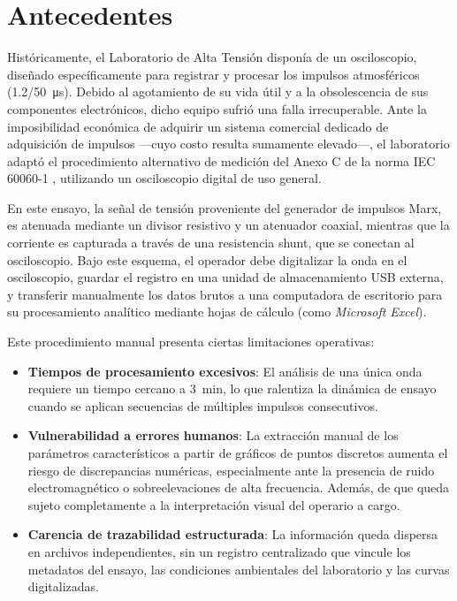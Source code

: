 \section{Antecedentes}
\label{sec:antecedentes}

Históricamente, el Laboratorio de Alta Tensión disponía de un osciloscopio, diseñado específicamente para registrar y procesar los impulsos atmosféricos (\qty[parse-numbers=false]{1.2/50}{\micro\second}). Debido al agotamiento de su vida útil y a la obsolescencia de sus componentes electrónicos, dicho equipo sufrió una falla irrecuperable. Ante la imposibilidad económica de adquirir un sistema comercial dedicado de adquisición de impulsos —cuyo costo resulta sumamente elevado—, el laboratorio adaptó el procedimiento alternativo de medición del Anexo C de la norma IEC 60060-1 \cite{iec60060_1}, utilizando un osciloscopio digital de uso general.

En este ensayo, la señal de tensión proveniente del generador de impulsos Marx, es atenuada mediante un divisor resistivo y un atenuador coaxial, mientras que la corriente es capturada a través de una resistencia shunt, que se conectan al osciloscopio. Bajo este esquema, el operador debe digitalizar la onda en el osciloscopio, guardar el registro en una unidad de almacenamiento USB externa, y transferir manualmente los datos brutos a una computadora de escritorio para su procesamiento analítico mediante hojas de cálculo (como \emph{Microsoft Excel}).

Este procedimiento manual presenta ciertas limitaciones operativas:
\begin{itemize}
    \item \textbf{Tiempos de procesamiento excesivos}: El análisis de una única onda requiere un tiempo cercano a \qty{3}{\minute}, lo que ralentiza la dinámica de ensayo cuando se aplican secuencias de múltiples impulsos consecutivos.
    \item \textbf{Vulnerabilidad a errores humanos}: La extracción manual de los parámetros característicos a partir de gráficos de puntos discretos aumenta el riesgo de discrepancias numéricas, especialmente ante la presencia de ruido electromagnético o sobreelevaciones de alta frecuencia. Además, de que queda sujeto completamente a la interpretación visual del operario a cargo.
    \item \textbf{Carencia de trazabilidad estructurada}: La información queda dispersa en archivos independientes, sin un registro centralizado que vincule los metadatos del ensayo, las condiciones ambientales del laboratorio y las curvas digitalizadas.
\end{itemize}

